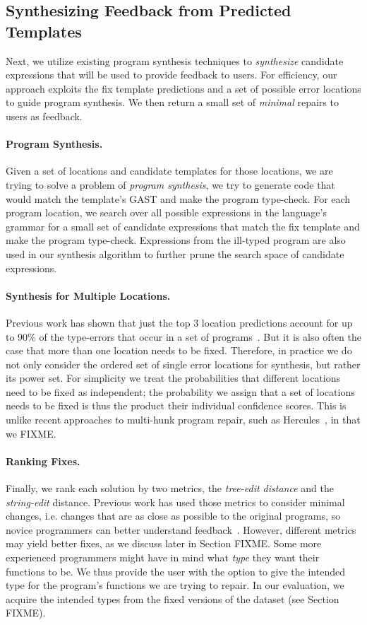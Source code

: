 \subsection{Synthesizing Feedback from Predicted Templates}
\label{sec:overview:synthesis}

Next, we utilize existing program synthesis techniques to \emph{synthesize}
candidate expressions that will be used to provide feedback to users. For efficiency, our
approach exploits the fix template predictions and a set of possible error
locations to guide program synthesis. We then
return a small set of \emph{minimal} repairs to users as feedback.

\paragraph{Program Synthesis.} Given a set of locations and candidate templates for
those locations, we are trying to solve a problem of \emph{program synthesis},
\ie we try to generate code that would match the template's GAST and make the
program type-check. For each program location, we search over all possible
expressions in the language's grammar for a small set of candidate
expressions that match the fix template and make the program type-check.
Expressions from the ill-typed program are also used in our synthesis algorithm
to further prune the search space of candidate expressions.

\paragraph{Synthesis for Multiple Locations.} Previous work has shown that just the
top 3 location predictions account for up to 90\% of the type-errors that occur
in a set of programs~\cite{FIXME}.
But it is also often the case that more than one location
needs to be fixed. Therefore, in practice we do not only consider the ordered set
of single error locations for synthesis, but rather its power set.
For simplicity we treat the probabilities that different locations need to be fixed
as independent; the probability we assign that a set of locations needs to be fixed
is thus the product their individual confidence scores. This is unlike
recent approaches to multi-hunk program repair, such as
Hercules~\cite{FIXME}, in that we FIXME.

\paragraph{Ranking Fixes.} Finally, we rank each solution by two metrics, the
\emph{tree-edit distance} and the \emph{string-edit} distance. Previous work has
used those metrics to consider minimal changes, i.e. changes that are as close
as possible to the original programs, so novice programmers can better
understand feedback~\cite{FIXME}. However, different metrics may yield better
fixes, as we discuss later in Section FIXME. Some more experienced programmers
might have in mind what \emph{type} they want their functions to be. We thus
provide the user with the option to give the intended type for the program's
functions we are trying to repair. In our evaluation, we acquire the intended
types from the fixed versions of the dataset (see Section FIXME).

